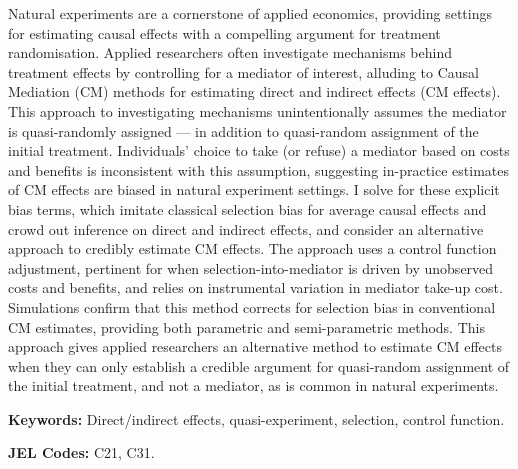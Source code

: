 \noindent
Natural experiments are a cornerstone of applied economics, providing settings for estimating causal effects with a compelling argument for treatment randomisation.
Applied researchers often investigate mechanisms behind treatment effects by controlling for a mediator of interest, alluding to Causal Mediation (CM) methods for estimating direct and indirect effects (CM effects).
This approach to investigating mechanisms unintentionally assumes the mediator is quasi-randomly assigned --- in addition to quasi-random assignment of the initial treatment.
Individuals' choice to take (or refuse) a mediator based on costs and benefits is inconsistent with this assumption, suggesting in-practice estimates of CM effects are biased in natural experiment settings.
I solve for these explicit bias terms, which imitate classical selection bias for average causal effects and crowd out inference on direct and indirect effects, and consider an alternative approach to credibly estimate CM effects.
The approach uses a control function adjustment, pertinent for when selection-into-mediator is driven by unobserved costs and benefits, and relies on instrumental variation in mediator take-up cost.
Simulations confirm that this method corrects for selection bias in conventional CM estimates, providing both parametric and semi-parametric methods.
This approach gives applied researchers an alternative method to estimate CM effects when they can only establish a credible argument for quasi-random assignment of the initial treatment, and not a mediator, as is common in natural experiments.

\vspace{0.5cm}
\noindent
\textbf{Keywords:}
Direct/indirect effects, quasi-experiment, selection, control function.

\vspace{0.1cm}
\noindent
\textbf{JEL Codes:}
C21, C31.
